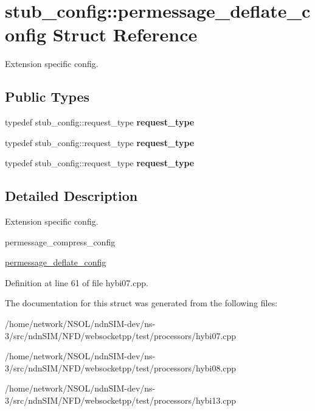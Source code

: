 \hypertarget{structstub__config_1_1permessage__deflate__config}{}\section{stub\+\_\+config\+:\+:permessage\+\_\+deflate\+\_\+config Struct Reference}
\label{structstub__config_1_1permessage__deflate__config}


Extension specific config.  


\subsection*{Public Types}
\begin{DoxyCompactItemize}
\item 
typedef stub\+\_\+config\+::request\+\_\+type {\bfseries request\+\_\+type}\hypertarget{structstub__config_1_1permessage__deflate__config_a042686c4994ab829d85e953045a0bdf4}{}\label{structstub__config_1_1permessage__deflate__config_a042686c4994ab829d85e953045a0bdf4}

\item 
typedef stub\+\_\+config\+::request\+\_\+type {\bfseries request\+\_\+type}\hypertarget{structstub__config_1_1permessage__deflate__config_a042686c4994ab829d85e953045a0bdf4}{}\label{structstub__config_1_1permessage__deflate__config_a042686c4994ab829d85e953045a0bdf4}

\item 
typedef stub\+\_\+config\+::request\+\_\+type {\bfseries request\+\_\+type}\hypertarget{structstub__config_1_1permessage__deflate__config_a042686c4994ab829d85e953045a0bdf4}{}\label{structstub__config_1_1permessage__deflate__config_a042686c4994ab829d85e953045a0bdf4}

\end{DoxyCompactItemize}


\subsection{Detailed Description}
Extension specific config. 

permessage\+\_\+compress\+\_\+config

\hyperlink{structstub__config_1_1permessage__deflate__config}{permessage\+\_\+deflate\+\_\+config} 

Definition at line 61 of file hybi07.\+cpp.



The documentation for this struct was generated from the following files\+:\begin{DoxyCompactItemize}
\item 
/home/network/\+N\+S\+O\+L/ndn\+S\+I\+M-\/dev/ns-\/3/src/ndn\+S\+I\+M/\+N\+F\+D/websocketpp/test/processors/hybi07.\+cpp\item 
/home/network/\+N\+S\+O\+L/ndn\+S\+I\+M-\/dev/ns-\/3/src/ndn\+S\+I\+M/\+N\+F\+D/websocketpp/test/processors/hybi08.\+cpp\item 
/home/network/\+N\+S\+O\+L/ndn\+S\+I\+M-\/dev/ns-\/3/src/ndn\+S\+I\+M/\+N\+F\+D/websocketpp/test/processors/hybi13.\+cpp\end{DoxyCompactItemize}
